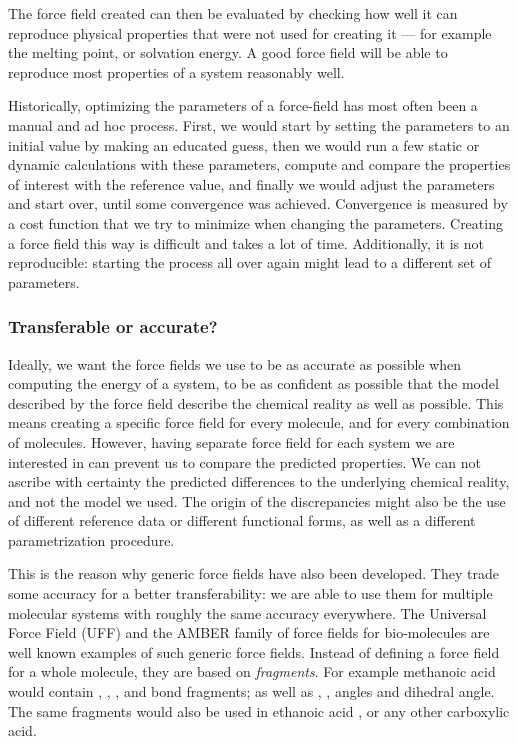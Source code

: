 \documentclass[thesis]{subfiles}
\begin{document}
The force field created can then be evaluated by checking how well it can
reproduce physical properties that were not used for creating it --- for example
the melting point, or solvation energy. A good force field will be able to
reproduce most properties of a system reasonably well.

Historically, optimizing the parameters of a force-field has most often been a
manual and ad hoc process. First, we would start by setting the parameters to an
initial value by making an educated guess, then we would run a few static or
dynamic calculations with these parameters, compute and compare the properties
of interest with the reference value, and finally we would adjust the parameters
and start over, until some convergence was achieved. Convergence is measured by
a cost function that we try to minimize when changing the parameters. Creating a
force field this way is difficult and takes a lot of time. Additionally, it is
not reproducible: starting the process all over again might lead to a different
set of parameters.

\subsubsection{Transferable or accurate?}

Ideally, we want the force fields we use to be as accurate as possible when
computing the energy of a system, to be as confident as possible that the model
described by the force field describe the chemical reality as well as possible.
This means creating a specific force field for every molecule, and for every
combination of molecules. However, having separate force field for each system
we are interested in can prevent us to compare the predicted properties. We can
not ascribe with certainty the predicted differences to the underlying chemical
reality, and not the model we used. The origin of the discrepancies might also
be the use of different reference data or different functional forms, as well as
a different parametrization procedure.

This is the reason why generic force fields have also been developed. They
trade some accuracy for a better transferability: we are able to use them for
multiple molecular systems with roughly the same accuracy everywhere. The
Universal Force Field\cite{Rappe1992} (UFF) and the AMBER family\cite{Wang2004}
of force fields for bio-molecules are well known examples of such generic force
fields. Instead of defining a force field for a whole molecule, they are based
on \emph{fragments}. For example methanoic acid  would contain
, , , and  bond fragments; as well as
, ,  angles and  dihedral angle. The
same fragments would also be used in ethanoic acid , or any other
carboxylic acid.
\end{document}
